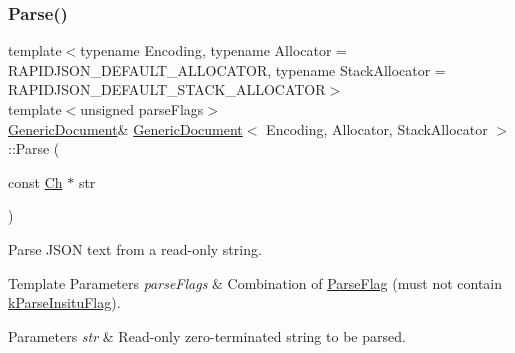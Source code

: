 \subsubsection{\texorpdfstring{Parse()}{Parse()}\hspace{0.1cm}{\footnotesize\ttfamily [2/6]}}
{\footnotesize\ttfamily template$<$typename Encoding, typename Allocator = R\+A\+P\+I\+D\+J\+S\+O\+N\+\_\+\+D\+E\+F\+A\+U\+L\+T\+\_\+\+A\+L\+L\+O\+C\+A\+T\+OR, typename Stack\+Allocator = R\+A\+P\+I\+D\+J\+S\+O\+N\+\_\+\+D\+E\+F\+A\+U\+L\+T\+\_\+\+S\+T\+A\+C\+K\+\_\+\+A\+L\+L\+O\+C\+A\+T\+OR$>$ \\
template$<$unsigned parse\+Flags$>$ \\
\hyperlink{classGenericDocument}{Generic\+Document}\& \hyperlink{classGenericDocument}{Generic\+Document}$<$ Encoding, Allocator, Stack\+Allocator $>$\+::Parse (\begin{DoxyParamCaption}\item[{const \hyperlink{classGenericValue_ade0e0ce64ccd5d852da57a35e720bafb}{Ch} $\ast$}]{str }\end{DoxyParamCaption})\hspace{0.3cm}{\ttfamily [inline]}}



Parse J\+S\+ON text from a read-\/only string. 


\begin{DoxyTemplParams}{Template Parameters}
{\em parse\+Flags} & Combination of \hyperlink{reader_8h_ab7be7dabe6ffcba60fad441505583450}{Parse\+Flag} (must not contain \hyperlink{reader_8h_ab7be7dabe6ffcba60fad441505583450a13188bd483b4df0b6582bebe2aeb5b01}{k\+Parse\+Insitu\+Flag}). \\
\hline
\end{DoxyTemplParams}

\begin{DoxyParams}{Parameters}
{\em str} & Read-\/only zero-\/terminated string to be parsed. \\
\hline
\end{DoxyParams}
\mbox{\label{classGenericDocument_a49ae6de6fd0bc820d9864a106c10b4da}} 

